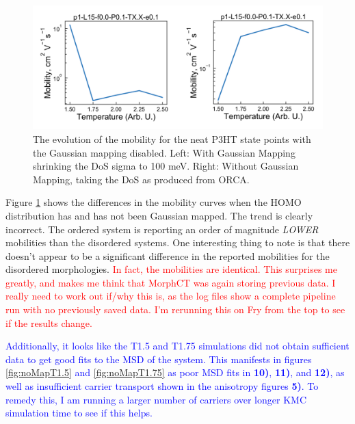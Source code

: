 \documentclass[12pt]{article}
\begin{document}
\begin{figure}[h!]\centering
	\includegraphics[width=\textwidth]{Figures/mobilityHole.pdf}
    \caption{The evolution of the mobility for the neat P3HT state points with the Gaussian mapping disabled.
        Left: With Gaussian Mapping shrinking the DoS sigma to 100 meV.
        Right: Without Gaussian Mapping, taking the DoS as produced from ORCA.
}
	\label{fig:Mobility}
\end{figure}


Figure \ref{fig:Mobility} shows the differences in the mobility curves when the HOMO distribution has and has not been Gaussian mapped.
The trend is clearly incorrect.
The ordered system is reporting an order of magnitude \textit{LOWER} mobilities than the disordered systems.
One interesting thing to note is that there doesn't appear to be a significant difference in the reported mobilities for the disordered morphologies.
\textcolor{red}{In fact, the mobilities are identical. 
    This surprises me greatly, and makes me think that MorphCT was again storing previous data. 
    I really need to work out if/why this is, as the log files show a complete pipeline run with no previously saved data.
    I'm rerunning this on Fry from the top to see if the results change.
}

\textcolor{blue}{Additionally, it looks like the T1.5 and T1.75 simulations did not obtain sufficient data to get good fits to the MSD of the system.
This manifests in figures \ref{fig:noMapT1.5} and \ref{fig:noMapT1.75} as poor MSD fits in \textbf{10)}, \textbf{11)}, and \textbf{12)}, as well as insufficient carrier transport shown in the anisotropy figures \textbf{5)}.
To remedy this, I am running a larger number of carriers over longer KMC simulation time to see if this helps.
}
\end{document}
